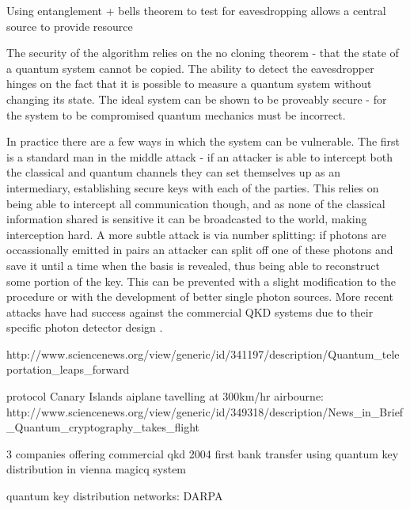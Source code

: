 Using entanglement + bells theorem \cite{bells_theorem} to test for eavesdropping
\cite{ekert_91} allows a central source to provide resource




The security of the algorithm relies on the no cloning theorem \cite{no_cloning} - that the state of a quantum system cannot be copied. The ability to detect the eavesdropper hinges on the fact that it is possible to measure a quantum system without changing its state. The ideal system can be shown to be proveably secure - for the system to be compromised quantum mechanics must be incorrect.

In practice there are a few ways in which the system can be vulnerable. The first is a standard man in the middle attack - if an attacker is able to intercept both the classical and quantum channels they can set themselves up as an intermediary, establishing secure keys with each of the parties. This relies on being able to intercept all communication though, and as none of the classical information shared is sensitive it can be broadcasted to the world, making interception hard. A more subtle attack is via number splitting\cite{qkd_number_splitting_attacks_00}: if photons are occassionally emitted in pairs an attacker can split off one of these photons and save it until a time when the basis is revealed, thus being able to reconstruct some portion of the key. This can be prevented with a slight modification to the procedure \cite{qkd_decoy_defense} or with the development of better single photon sources. More recent attacks have had success against the commercial QKD systems due to their specific photon detector design \cite{qkd_blinding_attack}.


http://www.sciencenews.org/view/generic/id/341197/description/Quantum_teleportation_leaps_forward
\cite{quantum_crypt_review}


\cite{quantum_repeaters} protocol
\cite{entanglement_97km_08}
\cite{entanglement_144km_07} Canary Islands
\cite{qkd_noisy_channel_12}
\cite{qkd_airbourne_13} aiplane tavelling at 300km/hr
airbourne: http://www.sciencenews.org/view/generic/id/349318/description/News_in_Brief_Quantum_cryptography_takes_flight

3 companies offering commercial qkd
2004 first bank transfer using quantum key distribution in vienna \cite{qkd_bank_transfer_04}
\cite{idquant_qkd_system} \cite{magiq_qkd_system}
magicq system

quantum key distribution networks: DARPA
\cite{secoqc_network}
\cite{tokyo_qkd_network}



